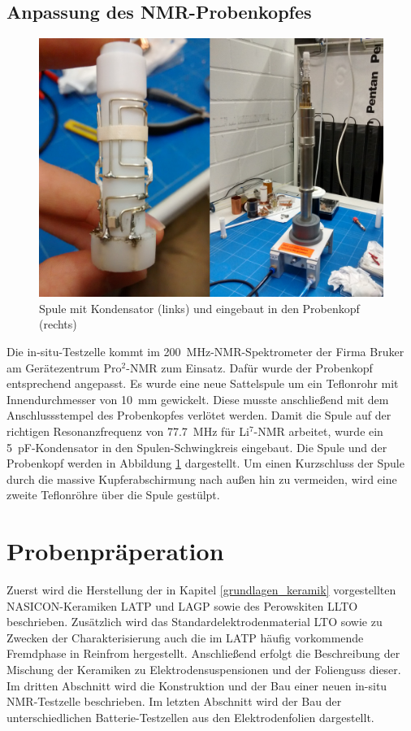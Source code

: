 \documentclass[a4paper, 11pt, headsepline,footsepline,twoside,abstract]{scrbook}
\begin{document}
\section{Anpassung des NMR-Probenkopfes}
\label{anpassung_probenkopf}
\begin{figure}
	\centering
	\includegraphics[width=0.85\columnwidth]{images/Platzhalter_Spule.jpg}
	\caption{Spule mit Kondensator (links) und eingebaut in den Probenkopf (rechts)}
	\label{spule}
\end{figure}
Die in-situ-Testzelle kommt im \SI{200}{\mega\hertz}-NMR-Spektrometer der Firma Bruker am Gerätezentrum Pro$^2$-NMR zum Einsatz. Dafür wurde der Probenkopf entsprechend angepasst. Es wurde eine neue Sattelspule um ein Teflonrohr mit Innendurchmesser von \SI{10}{\milli\metre} gewickelt. Diese musste anschließend mit dem Anschlussstempel des Probenkopfes verlötet werden. Damit die Spule auf der richtigen Resonanzfrequenz von \SI{77.7}{\mega\hertz} für Li$^7$-NMR arbeitet, wurde ein \SI{5}{\pico\farad}-Kondensator in den Spulen-Schwingkreis eingebaut. Die Spule und der Probenkopf werden in Abbildung \ref{spule} dargestellt. Um einen Kurzschluss der Spule durch die massive Kupferabschirmung nach außen hin zu vermeiden, wird eine zweite Teflonröhre über die Spule gestülpt.


\chapter{Probenpräperation}
Zuerst wird die Herstellung der in Kapitel \ref{grundlagen_keramik} vorgestellten NASICON-Keramiken LATP und LAGP sowie des Perowskiten LLTO beschrieben. Zusätzlich wird das Standardelektrodenmaterial LTO sowie zu Zwecken der Charakterisierung auch die im LATP häufig vorkommende Fremdphase  in Reinfrom hergestellt. Anschließend erfolgt die Beschreibung der Mischung der Keramiken zu Elektrodensuspensionen und der Folienguss dieser. Im dritten Abschnitt wird die Konstruktion und der Bau einer neuen in-situ NMR-Testzelle beschrieben. Im letzten Abschnitt wird der Bau der unterschiedlichen Batterie-Testzellen aus den Elektrodenfolien dargestellt. 
\end{document}
